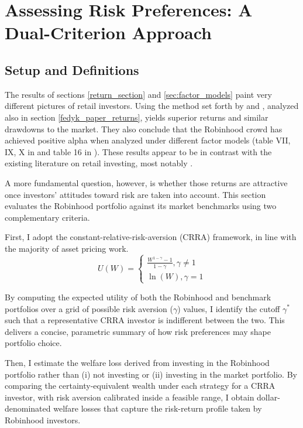 \section{Assessing Risk Preferences: A Dual-Criterion Approach}
\subsection{Setup and Definitions}
The results of sections \ref{return_section} and \ref{sec:factor_models} paint very different pictures of retail investors. 
Using the method set forth by \cite{Welch2022} and \cite{Fedyk2024}, analyzed also in section \ref{fedyk_paper_returns}, yields superior returns and similar drawdowns to the market.
They also conclude that the Robinhood crowd has achieved positive alpha when analyzed under different factor models (table VII, IX, X in \cite{Welch2022} and table 16 in \cite{Fedyk2024}). 
These results appear to be in contrast with the existing literature on retail investing, most notably \cite{BarberOdean2000}.

A more fundamental question, however, is whether those returns are attractive once investors' attitudes toward risk are taken into account.
This section evaluates the Robinhood portfolio against its market benchmarks using two complementary criteria.

First, I adopt the constant-relative-risk-aversion (CRRA) framework, in line with the majority of asset pricing work.
\begin{equation}
    U(W) = 
    \begin{cases}
    \frac{W^{1-\gamma}-1}{1-\gamma}, \gamma\neq 1\\
    \ln(W), \gamma = 1
    \end{cases}
    \label{CRRA}
\end{equation}

By computing the expected utility of both the Robinhood and benchmark portfolios over a grid of possible risk aversion ($\gamma$) values,
I identify the cutoff $\gamma^*$ such that a representative CRRA investor is indifferent between the two.
This delivers a concise, parametric summary of how risk preferences may shape portfolio choice.

Then, I estimate the welfare loss derived from investing in the Robinhood portfolio rather than (i)  not investing or (ii) investing in the market portfolio.
By comparing the certainty-equivalent wealth under each strategy for a CRRA investor, with risk aversion calibrated inside a feasible range,
I obtain dollar-denominated welfare losses that capture the risk-return profile taken by Robinhood investors.

